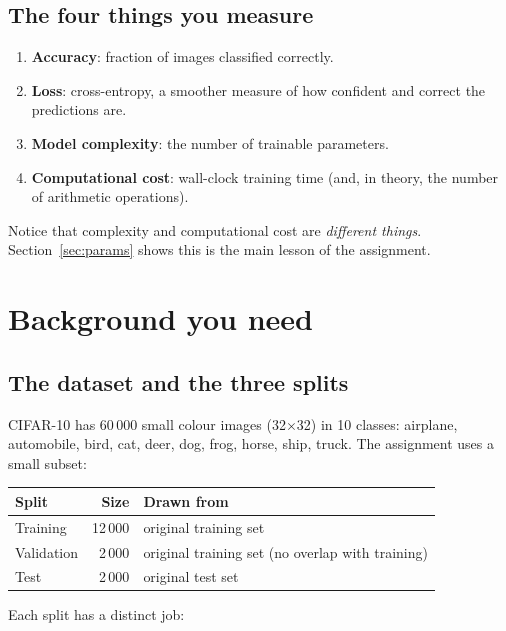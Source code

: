 \documentclass[11pt]{article}
\newcommand{\key}[1]{\textbf{#1}}
\begin{document}
\subsection{The four things you measure}

\begin{enumerate}[noitemsep]
\item \key{Accuracy}: fraction of images classified correctly.
\item \key{Loss}: cross-entropy, a smoother measure of how confident and correct the predictions are.
\item \key{Model complexity}: the number of trainable parameters.
\item \key{Computational cost}: wall-clock training time (and, in theory, the number of arithmetic operations).
\end{enumerate}

Notice that complexity and computational cost are \emph{different things}. Section~\ref{sec:params} shows this is the main lesson of the assignment.

\section{Background you need}

\subsection{The dataset and the three splits}

CIFAR-10 has 60\,000 small colour images (32$\times$32) in 10 classes: airplane, automobile, bird, cat, deer, dog, frog, horse, ship, truck. The assignment uses a small subset:

\begin{center}
\begin{tabular}{lrl}
\toprule
Split & Size & Drawn from \\
\midrule
Training & 12\,000 & original training set \\
Validation & 2\,000 & original training set (no overlap with training) \\
Test & 2\,000 & original test set \\
\bottomrule
\end{tabular}
\end{center}

Each split has a distinct job:
\end{document}
